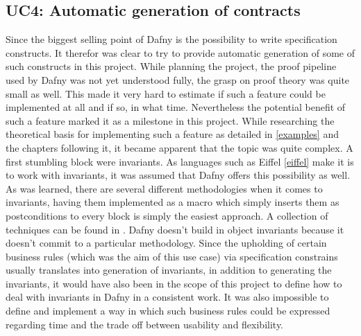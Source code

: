\subsection{UC4: Automatic generation of contracts}\label{missinguc4}
Since the biggest selling point of Dafny is the possibility to write specification constructs. It therefor was clear to try to provide automatic generation of some of such constructs in this project. While planning the project, the proof pipeline used by Dafny was not yet understood fully, the grasp on proof theory was quite small as well. This made it very hard to estimate if such a feature could be implemented at all and if so, in what time. Nevertheless the potential benefit of such a feature marked it as a milestone in this project. \newline
While researching the theoretical basis for implementing such a feature as detailed in \ref{examples} and the chapters following it, it became apparent that the topic was quite complex. A first stumbling block were invariants. As languages such as Eiffel \ref{eiffel} make it is to work with invariants, it was assumed that Dafny offers this possibility as well. \newline
As was learned, there are several different methodologies when it comes to invariants, having them implemented as a macro which simply inserts them as postconditions to every block is simply the easiest approach. A collection of techniques can be found in \cite{invariants}. 
Dafny doesn't build in object invariants because it doesn't commit to a particular methodology. Since the upholding of certain business rules (which was the aim of this use case) via specification constrains usually translates into generation of invariants, in addition to generating the invariants, it would have also been in the scope of this project to define how to deal with invariants in Dafny in a consistent work. It was also impossible to define and implement a way in which such business rules could be expressed regarding time and the trade off between usability and flexibility.\newline
